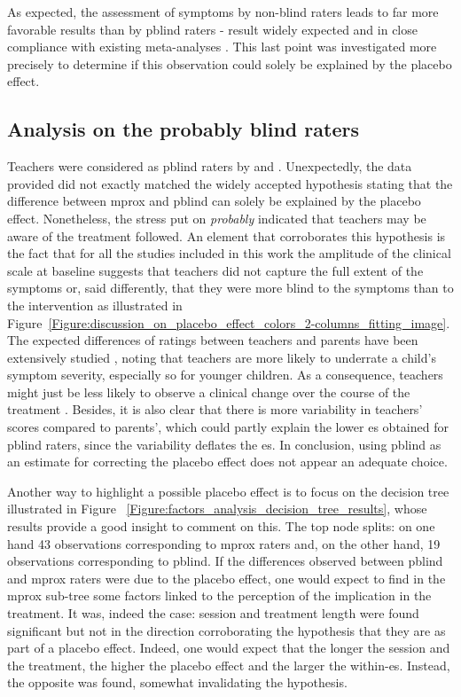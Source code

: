 As expected, the assessment of symptoms by non-blind raters leads to far more favorable results than by \gls{pblind} raters -
result widely expected and in close compliance with existing meta-analyses \citep{Cortese2016, Micoulaud2014}. This last point
was investigated more precisely to determine if this observation could solely be explained by the placebo effect. 

\subsection{Analysis on the probably blind raters}

Teachers were considered as \gls{pblind} raters by \citeauthor{Cortese2016} and \citeauthor{Micoulaud2014}.
Unexpectedly, the data provided did not exactly matched the widely accepted hypothesis stating that the difference between
\gls{mprox} and \gls{pblind} can solely be explained by the placebo effect. 
Nonetheless, the stress put on \emph{probably} indicated that teachers may be aware of the treatment followed. 
An element that corroborates this hypothesis is the fact that for all the studies included in this work the amplitude 
of the clinical scale at baseline suggests that teachers did not capture the full extent of the symptoms or, said differently, 
that they were more blind to the symptoms than to the intervention as illustrated 
in Figure~\ref{Figure:discussion_on_placebo_effect_colors_2-columns_fitting_image}. The expected differences of ratings between 
teachers and parents have been extensively studied \citep{Sollie2013, Narad2015, Minder2018}, noting that teachers are more 
likely to underrate a child's symptom severity, especially so for younger children. As a consequence, teachers might just be less likely 
to observe a clinical change over the course of the treatment \citep{Sollie2013, Narad2015, Minder2018}. Besides, it is also clear 
that there is more variability in teachers' scores compared to parents', which could partly explain the lower \gls{es} obtained for 
\gls{pblind} raters, since the variability deflates the \gls{es}. In conclusion, using \gls{pblind} as an estimate for correcting the 
placebo effect does not appear an adequate choice. 

Another way to highlight a possible placebo effect is to focus on the decision tree illustrated in Figure
~\ref{Figure:factors_analysis_decision_tree_results}, whose results provide a good insight to comment on this.
The top node splits: on one hand 43 observations corresponding to \gls{mprox} raters and, on the other hand, 
19 observations corresponding to \gls{pblind}. If the differences observed between \gls{pblind} and \gls{mprox} raters were 
due to the placebo effect, one would expect to find in the \gls{mprox} sub-tree some factors linked to the perception
of the implication in the treatment. It was, indeed the case: session and treatment length were found significant but not in the
direction corroborating the hypothesis that they are as part of a placebo effect. Indeed, one would expect that the
longer the session and the treatment, the higher the placebo effect and the larger the within-\gls{es}. Instead, the opposite was found, 
somewhat invalidating the hypothesis. 

